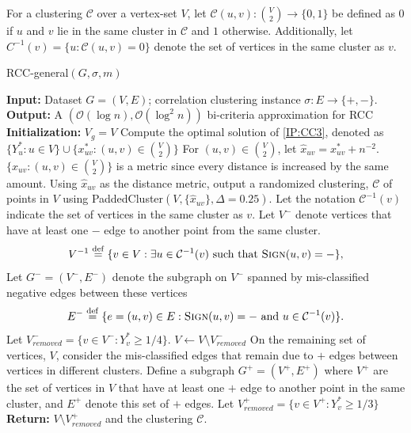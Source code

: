 For a clustering $\mathcal{C}$ over a vertex-set $V$, let $\mathcal{C} (u,v) : \binom{V}{2} \to \{ 0,1 \}$ be defined as $0$ if $u$ and $v$ lie in the same cluster in $\mathcal{C}$ and $1$ otherwise. Additionally, let $C^{-1} (v) = \{ u : \mathcal{C} (u,v) = 0\}$ denote the set of vertices in the same cluster as $v$.
\begin{algorithm}
\caption{{\sf RCC-general}$(G,\sigma,m)$}
\label{alg:RCC-general}
\begin{algorithmic}[1]
\Statex \textbf{Input:} Dataset $G = (V,E)$; correlation clustering instance $\sigma : E \to \{ +,- \}$.
\Statex \textbf{Output:} A $\left(\mathcal{O} (\log n), \mathcal{O}(\log^2 n) \right)$ bi-criteria approximation for RCC
\Statex \textbf{Initialization:} $V_{g} = V$ 
\State Compute the optimal solution of \ref{IP:CC3}, denoted as $\{ Y_u^* : u \in V\} \cup \{ x_{uv}^* : (u,v) \in \binom{V}{2} \}$
\State For $(u,v) \in \binom{V}{2}$, let $\hat{x}_{uv} = x_{uv}^* + n^{-2}$. $\{ \hat{x}_{uv} : (u,v) \in \binom{V}{2} \}$ is a metric since every distance is increased by the same amount.
\State Using $\hat{x}_{uv}$ as the distance metric, output a randomized clustering, $\mathcal{C}$ of points in $V$ using {\sf PaddedCluster}$(V,\{ \hat{x}_{uv}\},\Delta=0.25)$. Let the notation $\mathcal{C}^{-1} (v)$ indicate the set of vertices in the same cluster as $v$.
\State Let $V^-$ denote vertices that have at least one $-$ edge to another point from the same cluster.
$$ V^{-1} \overset{\mathrm{def}}{=} \{ v \in V : \exists u \in \mathcal{C}^{-1} (v) \text{ such that } \textsc{Sign} (u,v) = - \},$$
\Statex Let $G^- = (V^-,E^-)$ denote the subgraph on $V^-$ spanned by mis-classified negative edges between these vertices
$$ E^- \overset{\mathrm{def}}{=} \{ e = (u,v) \in E : \textsc{Sign} (u,v) = - \text{ and } u \in \mathcal{C}^{-1} (v)\}.$$
\State Let $V_{removed}^- = \{ v \in V^- : Y_v^* \ge 1/4\}$.
\State $V \gets V \setminus V_{removed}^-$
\State On the remaining set of vertices, $V$, consider the mis-classified edges that remain due to $+$ edges between vertices in different clusters. Define a subgraph $G^+ = (V^+,E^+)$ where $V^+$ are the set of vertices in $V$ that have at least one $+$ edge to another point in the same cluster, and $E^+$ denote this set of $+$ edges.
\State Let $V_{removed}^+ = \{v \in V^+ : Y_v^* \ge 1/3 \}$ 
\State \textbf{Return:} $V \setminus V_{removed}^+$ and the clustering $\mathcal{C}$.
\end{algorithmic}
\end{algorithm}


